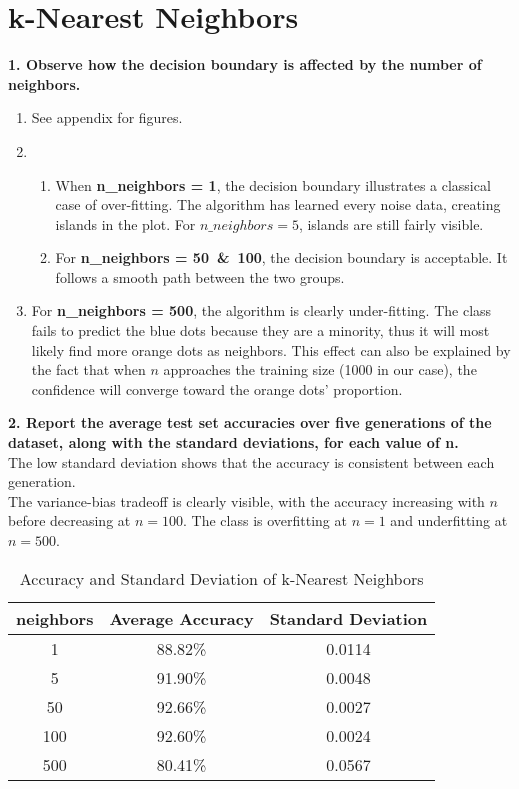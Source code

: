 \documentclass[acmconf,nonacm=true]{acmart}
\begin{document}
\section{k-Nearest Neighbors}
\textbf{1. Observe how the decision boundary is affected by the number of neighbors.}
    \begin{enumerate}
    \item See appendix for figures.
    \item 
        \begin{enumerate}
            \item When \textbf{n\_neighbors = 1}, the decision boundary illustrates a classical case of over-fitting. The algorithm has learned every noise data, creating islands in the plot. For $n\_neighbors = 5$, islands are still fairly visible.
            \item For \textbf{n\_neighbors = 50\ \&\ 100}, the decision boundary is acceptable. It follows a smooth path between the two groups.
        \end{enumerate}
    \item For \textbf{n\_neighbors = 500}, the algorithm is clearly under-fitting. The class fails to predict the blue dots because they are a minority, thus it will most likely find more orange dots as neighbors. This effect can also be explained by the fact that when $n$ approaches the training size (1000 in our case), the confidence will converge toward the orange dots' proportion.
    \end{enumerate}
\textbf{2. Report the average test set accuracies over five generations of the dataset,
along with the standard deviations, for each value of n.}\\
The low standard deviation shows that the accuracy is consistent between each generation.\\
The variance-bias tradeoff is clearly visible, with the accuracy increasing with $n$ before decreasing at $n=100$. The class is overfitting at $n=1$ and underfitting at $n=500$.

    \begin{table}[H]
    \centering
    \caption{Accuracy and Standard Deviation of k-Nearest Neighbors}
    \begin{tabular}{|c|c|c|}
    \hline
     neighbors & Average Accuracy & Standard Deviation \\
    \hline
    1 & 88.82\% & 0.0114 \\
    5 & 91.90\% & 0.0048 \\
    50 & 92.66\% & 0.0027 \\
    100 & 92.60\% & 0.0024 \\
    500 & 80.41\% & 0.0567 \\
    \hline
    \end{tabular}
    \end{table}
\end{document}
